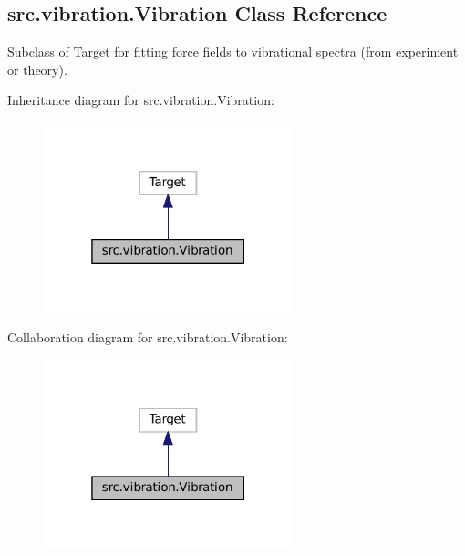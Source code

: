 \hypertarget{classsrc_1_1vibration_1_1Vibration}{}\subsection{src.\+vibration.\+Vibration Class Reference}
\label{classsrc_1_1vibration_1_1Vibration}


Subclass of Target for fitting force fields to vibrational spectra (from experiment or theory).  




Inheritance diagram for src.\+vibration.\+Vibration\+:
\nopagebreak
\begin{figure}[H]
\begin{center}
\leavevmode
\includegraphics[width=205pt]{classsrc_1_1vibration_1_1Vibration__inherit__graph}
\end{center}
\end{figure}


Collaboration diagram for src.\+vibration.\+Vibration\+:
\nopagebreak
\begin{figure}[H]
\begin{center}
\leavevmode
\includegraphics[width=205pt]{classsrc_1_1vibration_1_1Vibration__coll__graph}
\end{center}
\end{figure}
